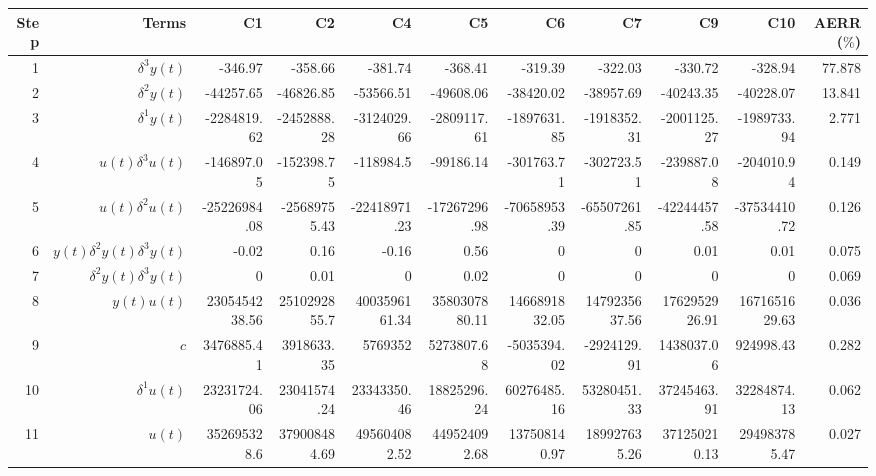 \begin{tabular}{rrrrrrrrrrr}
Step & Terms & C1 & C2 & C4 & C5 & C6 & C7 & C9 & C10 & AERR($\%$) \\ 
\hline 
1 & $\delta^3 y(t)$ & -346.97 & -358.66 & -381.74 & -368.41 & -319.39 & -322.03 & -330.72 & -328.94 & 77.878 \\ 
2 & $\delta^2 y(t)$ & -44257.65 & -46826.85 & -53566.51 & -49608.06 & -38420.02 & -38957.69 & -40243.35 & -40228.07 & 13.841 \\ 
3 & $\delta^1 y(t)$ & -2284819.62 & -2452888.28 & -3124029.66 & -2809117.61 & -1897631.85 & -1918352.31 & -2001125.27 & -1989733.94 & 2.771 \\ 
4 & $u(t)\delta^3 u(t)$ & -146897.05 & -152398.75 & -118984.5 & -99186.14 & -301763.71 & -302723.51 & -239887.08 & -204010.94 & 0.149 \\ 
5 & $u(t)\delta^2 u(t)$ & -25226984.08 & -25689755.43 & -22418971.23 & -17267296.98 & -70658953.39 & -65507261.85 & -42244457.58 & -37534410.72 & 0.126 \\ 
6 & $y(t)\delta^2 y(t)\delta^3 y(t)$ & -0.02 & 0.16 & -0.16 & 0.56 & 0 & 0 & 0.01 & 0.01 & 0.075 \\ 
7 & $\delta^2 y(t)\delta^3 y(t)$ & 0 & 0.01 & 0 & 0.02 & 0 & 0 & 0 & 0 & 0.069 \\ 
8 & $y(t)u(t)$ & 2305454238.56 & 2510292855.7 & 4003596161.34 & 3580307880.11 & 1466891832.05 & 1479235637.56 & 1762952926.91 & 1671651629.63 & 0.036 \\ 
9 & $c$ & 3476885.41 & 3918633.35 & 5769352 & 5273807.68 & -5035394.02 & -2924129.91 & 1438037.06 & 924998.43 & 0.282 \\ 
10 & $\delta^1 u(t)$ & 23231724.06 & 23041574.24 & 23343350.46 & 18825296.24 & 60276485.16 & 53280451.33 & 37245463.91 & 32284874.13 & 0.062 \\ 
11 & $u(t)$ & 352695328.6 & 379008484.69 & 495604082.52 & 449524092.68 & 137508140.97 & 189927635.26 & 371250210.13 & 294983785.47 & 0.027 \\ 
\hline 
\end{tabular}